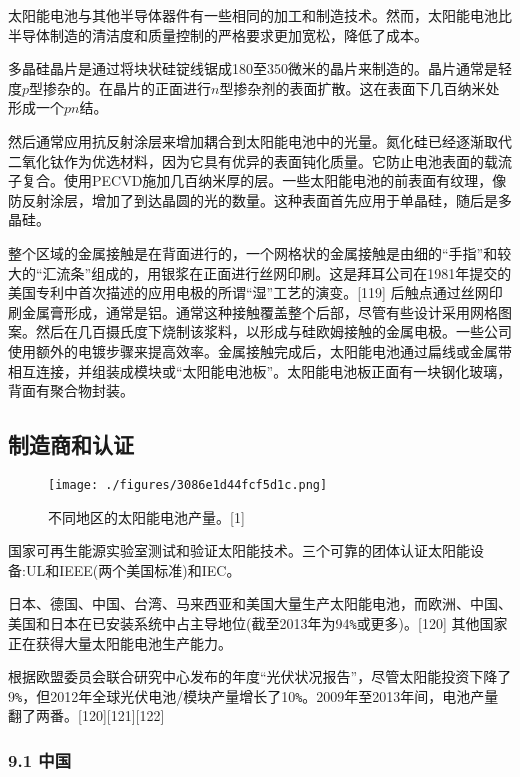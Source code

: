 太阳能电池与其他半导体器件有一些相同的加工和制造技术。然而，太阳能电池比半导体制造的清洁度和质量控制的严格要求更加宽松，降低了成本。

多晶硅晶片是通过将块状硅锭线锯成180至350微米的晶片来制造的。晶片通常是轻度$p$型掺杂的。在晶片的正面进行$n$型掺杂剂的表面扩散。这在表面下几百纳米处形成一个$pn$结。

然后通常应用抗反射涂层来增加耦合到太阳能电池中的光量。氮化硅已经逐渐取代二氧化钛作为优选材料，因为它具有优异的表面钝化质量。它防止电池表面的载流子复合。使用PECVD施加几百纳米厚的层。一些太阳能电池的前表面有纹理，像防反射涂层，增加了到达晶圆的光的数量。这种表面首先应用于单晶硅，随后是多晶硅。

整个区域的金属接触是在背面进行的，一个网格状的金属接触是由细的“手指”和较大的“汇流条”组成的，用银浆在正面进行丝网印刷。这是拜耳公司在1981年提交的美国专利中首次描述的应用电极的所谓“湿”工艺的演变。[119] 后触点通过丝网印刷金属膏形成，通常是铝。通常这种接触覆盖整个后部，尽管有些设计采用网格图案。然后在几百摄氏度下烧制该浆料，以形成与硅欧姆接触的金属电极。一些公司使用额外的电镀步骤来提高效率。金属接触完成后，太阳能电池通过扁线或金属带相互连接，并组装成模块或“太阳能电池板”。太阳能电池板正面有一块钢化玻璃，背面有聚合物封装。

\subsection{制造商和认证}

\begin{figure}[ht]
\centering
\texttt{[image: ./figures/3086e1d44fcf5d1c.png]}
\caption{不同地区的太阳能电池产量。[1]} \label{fig_TYNDC_2}
\end{figure}

国家可再生能源实验室测试和验证太阳能技术。三个可靠的团体认证太阳能设备:UL和IEEE(两个美国标准)和IEC。

日本、德国、中国、台湾、马来西亚和美国大量生产太阳能电池，而欧洲、中国、美国和日本在已安装系统中占主导地位(截至2013年为94\verb|%|或更多)。[120] 其他国家正在获得大量太阳能电池生产能力。

根据欧盟委员会联合研究中心发布的年度“光伏状况报告”，尽管太阳能投资下降了9\verb|%|，但2012年全球光伏电池/模块产量增长了10\verb|%|。2009年至2013年间，电池产量翻了两番。[120][121][122]

\subsubsection{9.1 中国}

